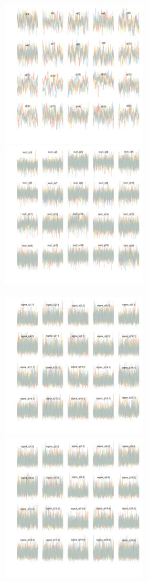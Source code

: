\documentclass[varwidth=\maxdimen,border=0pt]{standalone}
\begin{document}
\begin{figure}

    \begin{subfigure}{6cm}
        \centering
                \includegraphics[width=6cm]{../../figures/convergence/convergence-belowground-a-1.jpeg} 
                \includegraphics[width=6cm]{../../figures/convergence/convergence-belowground-mu0_s-1.jpeg} 
    \end{subfigure}%
           \begin{subfigure}{6cm}
        \centering
                \includegraphics[width=6cm]{../../figures/convergence/convergence-belowground-sigma_s-1.jpeg} 
                \includegraphics[width=6cm]{../../figures/convergence/convergence-belowground-sigma_s-2.jpeg} 
          \end{subfigure}%
\end{figure}
  
  
\end{document}
